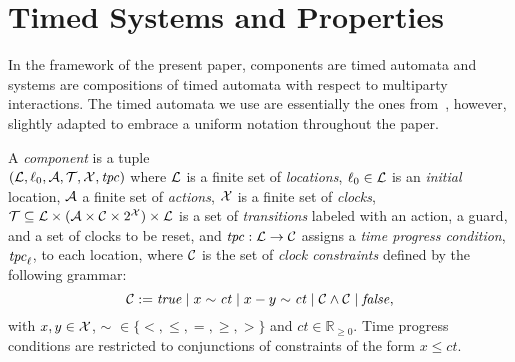 \section{Timed Systems and Properties}
\label{sec2}

In the framework of the present paper, components are timed automata
and systems are compositions of timed automata with respect to
multiparty interactions. The timed automata we use are essentially
the ones from~\cite{alur94}, however, slightly adapted to embrace a
uniform notation throughout the paper.

\begin{definition}[Component]
  \label{def:atom}
  A \emph{component} is a tuple
  \\$(\mathcal{L},\ell_0,\mathcal{A},\mathcal{T},\mathcal{X},\mathit{tpc})$ where
  $\mathcal{L}$ is a finite set of \emph{locations}, $\ell_0 \in \mathcal{L}$ is an \emph{initial} location, $\mathcal{A}$
  a finite set of \emph{actions}, $\mathcal{X}$ is a finite set of
  \emph{clocks}, $\mathcal{T} \subseteq \mathcal{L}\times(\mathcal{A}\times \mathcal{C}
  \times 2^{\mathcal{X}})\times \mathcal{L}$ is a set of \emph{transitions} labeled with an action, a
  guard, and a set of clocks to be reset,
  and $\mathit{tpc}: \mathcal{L}\rightarrow\mathcal{C}$ assigns a \emph{time
  progress condition}, $\mathit{tpc}_{\ell}$,
    to each location, where $\mathcal{C}$ is the set of \emph{clock
  constraints} defined by the following grammar: 
  \begin{displaymath} 
    \mathcal{C} := \textnormal{\textit{true}} \mid x\sim\mathit{ct} \mid x - y \sim\mathit{ct} \mid \mathcal{C} 
    \wedge \mathcal{C}\mid\textnormal{\textit{false}}, 
\end{displaymath}
  with $x, y\in \mathcal{X}$, $\sim$ $\in\{<,\le,=,\ge,>\}$ and $\mathit{ct} \in
  \mathbb{R}_{\ge 0}$.
 Time progress conditions are restricted to conjunctions of
  constraints of the form $x \leq \mathit{ct}$.
\end{definition}

